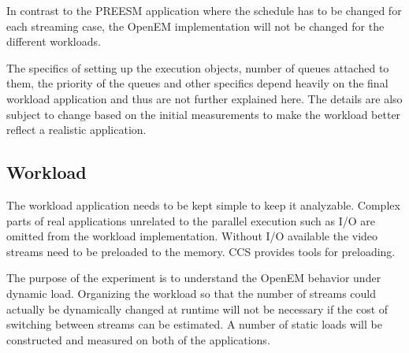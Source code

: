 In contrast to the PREESM application where the schedule has to be changed for each streaming case, the OpenEM implementation will not be changed for the different workloads.

The specifics of setting up the execution objects, number of queues attached to them, the priority of the queues and other specifics depend heavily on the final workload application and thus are not further explained here. The details are also subject to change based on the initial measurements to make the workload better reflect a realistic application.
\subsection{Workload}
The workload application needs to be kept simple to keep it analyzable. Complex parts of real applications unrelated to the parallel execution such as I/O are omitted from the workload implementation. Without I/O available the video streams need to be preloaded to the memory. CCS provides tools for preloading.

The purpose of the experiment is to understand the OpenEM behavior under dynamic load. Organizing the workload so that the number of streams could actually be dynamically changed at runtime will not be necessary if the cost of switching between streams can be estimated. A number of static loads will be constructed and measured on both of the applications.